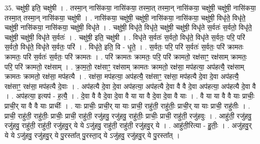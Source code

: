 \documentclass[17pt]{extarticle}
\begin{document}
35. चक्षु॑षी॒ इति॒ चक्षु॑षी । . तस्मा॒न् नासि॑कया॒ नासि॑कया॒ तस्मा॒त् तस्मा॒न् नासि॑कया॒ चक्षु॑षी॒ चक्षु॑षी॒ नासि॑कया॒ तस्मा॒त् तस्मा॒न् नासि॑कया॒ चक्षु॑षी । . नासि॑कया॒ चक्षु॑षी॒ चक्षु॑षी॒ नासि॑कया॒ नासि॑कया॒ चक्षु॑षी॒ विधृ॑ते॒ विधृ॑ते॒ चक्षु॑षी॒ नासि॑कया॒ नासि॑कया॒ चक्षु॑षी॒ विधृ॑ते । . चक्षु॑षी॒ विधृ॑ते॒ विधृ॑ते॒ चक्षु॑षी॒ चक्षु॑षी॒ विधृ॑ते स॒र्वतः॑ स॒र्वतो॒ विधृ॑ते॒ चक्षु॑षी॒ चक्षु॑षी॒ विधृ॑ते स॒र्वतः॑ । . चक्षु॑षी॒ इति॒ चक्षु॑षी । . विधृ॑ते स॒र्वतः॑ स॒र्वतो॒ विधृ॑ते॒ विधृ॑ते स॒र्वतः॒ परि॒ परि॑ स॒र्वतो॒ विधृ॑ते॒ विधृ॑ते स॒र्वतः॒ परि॑ । . विधृ॑ते॒ इति॒ वि - धृ॒ते॒ । . स॒र्वतः॒ परि॒ परि॑ स॒र्वतः॑ स॒र्वतः॒ परि॑ क्रामतः क्रामतः॒ परि॑ स॒र्वतः॑ स॒र्वतः॒ परि॑ क्रामतः । . परि॑ क्रामतः क्रामतः॒ परि॒ परि॑ क्रामतो॒ रक्ष॑साꣳ॒॒ रक्ष॑साम् क्रामतः॒ परि॒ परि॑ क्रामतो॒ रक्ष॑साम् । . क्रा॒म॒तो॒ रक्ष॑साꣳ॒॒ रक्ष॑साम् क्रामतः क्रामतो॒ रक्ष॑सा॒ मप॑हत्या॒ अप॑हत्यै॒ रक्ष॑साम् क्रामतः क्रामतो॒ रक्ष॑सा॒ मप॑हत्यै । . रक्ष॑सा॒ मप॑हत्या॒ अप॑हत्यै॒ रक्ष॑साꣳ॒॒ रक्ष॑सा॒ मप॑हत्यै दे॒वा दे॒वा अप॑हत्यै॒ रक्ष॑साꣳ॒॒ रक्ष॑सा॒ मप॑हत्यै दे॒वाः । . अप॑हत्यै दे॒वा दे॒वा अप॑हत्या॒ अप॑हत्यै दे॒वा वै वै दे॒वा अप॑हत्या॒ अप॑हत्यै दे॒वा वै । . अप॑हत्या॒ इत्यप॑ - ह॒त्यै॒ । . दे॒वा वै वै दे॒वा दे॒वा वै या या वै दे॒वा दे॒वा वै याः । . वै या या वै वै याः प्राचीः॒ प्राची॒र् या वै वै याः प्राचीः᳚ । . याः प्राचीः॒ प्राची॒र् या याः प्राची॒ राहु॑ती॒ राहु॑तीः॒ प्राची॒र् या याः प्राची॒ राहु॑तीः । . प्राची॒ राहु॑ती॒ राहु॑तीः॒ प्राचीः॒ प्राची॒ राहु॑ती॒ रजु॑हवु॒ रजु॑हवु॒ राहु॑तीः॒ प्राचीः॒ प्राची॒ राहु॑ती॒ रजु॑हवुः । . आहु॑ती॒ रजु॑हवु॒ रजु॑हवु॒ राहु॑ती॒ राहु॑ती॒ रजु॑हवु॒र् ये ये ऽजु॑हवु॒ राहु॑ती॒ राहु॑ती॒ रजु॑हवु॒र् ये । . आहु॑ती॒रित्या - हु॒तीः॒ । . अजु॑हवु॒र् ये ये ऽजु॑हवु॒ रजु॑हवु॒र् ये पु॒रस्ता᳚त् पु॒रस्ता॒द् ये ऽजु॑हवु॒ रजु॑हवु॒र् ये पु॒रस्ता᳚त् । \newline
\end{document}
